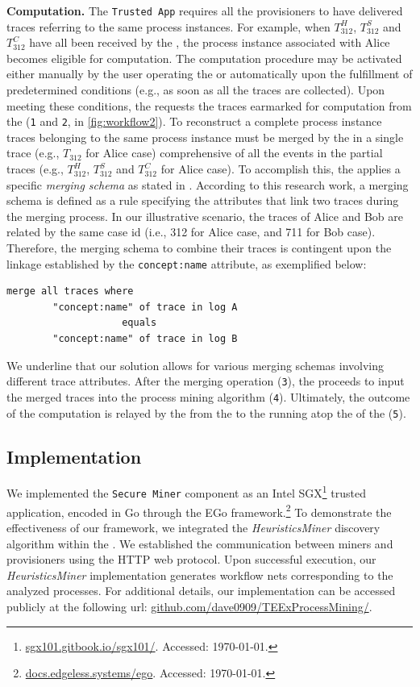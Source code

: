 \textbf{Computation.} The \texttt{Trusted App} requires all the provisioners to have delivered traces referring to the same process instances. For example, when $T^H_{312}$, $T^S_{312}$ and $T^C_{312}$ have all been received by the , the process instance associated with Alice becomes eligible for computation. The computation procedure may be activated either manually by the user operating the  or automatically upon the fulfillment of predetermined conditions (e.g., as soon as all the traces are collected). Upon meeting these conditions, the  requests the traces earmarked for computation from the  (\texttt{1} and \texttt{2}, in \cref{fig:workflow2}). To reconstruct a complete process instance traces belonging to the same process instance must be merged by the  in a single trace (e.g., $T_{312}$ for Alice case) comprehensive of all the events in the partial traces (e.g., $T^H_{312}$, $T^S_{312}$ and $T^C_{312}$ for Alice case). To accomplish this, the  applies a specific \textit{merging schema} as stated in \cite{claes2014merging}. According to this research work, a merging schema is defined as a rule specifying the attributes that link two traces during the merging process. In our illustrative scenario, the traces of Alice and Bob are related by the same case id (i.e., 312 for Alice case, and 711 for Bob case). Therefore, the merging schema to combine their traces is contingent upon the linkage established by the \texttt{concept:name} attribute, as exemplified below:
\begin{lstlisting}[numbers=none]
    merge all traces where
    	"concept:name" of trace in log A
    				equals
    	"concept:name" of trace in log B
\end{lstlisting}
We underline that our solution allows for various merging schemas involving different trace attributes. After the merging operation (\texttt{3}), the  proceeds to input the merged traces into the process mining algorithm (\texttt{4}). Ultimately, the outcome of the computation is relayed by the  from the  to the  running atop the  of the  (\texttt{5}).

\subsection{Implementation}
\label{sec:implementation:details}
We implemented the \texttt{Secure Miner} component as an Intel SGX\footnote{\url{sgx101.gitbook.io/sgx101/}. Accessed: \today.} trusted application, encoded in Go through the EGo framework.\footnote{\url{docs.edgeless.systems/ego}. Accessed: \today.} To demonstrate the effectiveness of our framework, we integrated the \textit{HeuristicsMiner} discovery algorithm within the . We established the communication between miners and provisioners using the HTTP web protocol. Upon successful execution, our \textit{HeuristicsMiner} implementation generates workflow nets corresponding to the analyzed processes. For additional details, our implementation can be accessed publicly at the following url: \url{github.com/dave0909/TEExProcessMining/}.
